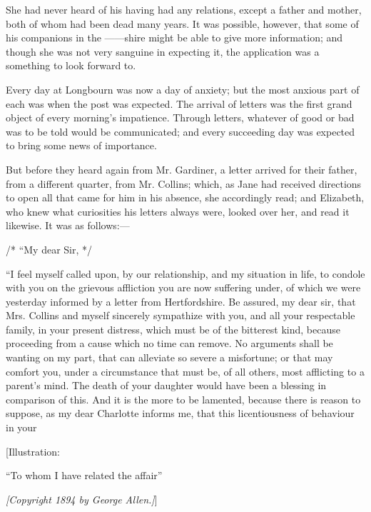\documentclass[12pt]{book}
\begin{document}
She had never heard of his having had any relations, except a father and mother, both of whom had been dead many years. It was possible, however, that some of his companions in the ------shire might be able to give more information; and though she was not very sanguine in expecting it, the application was a something to look forward to.

Every day at Longbourn was now a day of anxiety; but the most anxious part of each was when the post was expected. The arrival of letters was the first grand object of every morning's impatience. Through letters, whatever of good or bad was to be told would be communicated; and every succeeding day was expected to bring some news of importance.

But before they heard again from Mr. Gardiner, a letter arrived for their father, from a different quarter, from Mr. Collins; which, as Jane had received directions to open all that came for him in his absence, she accordingly read; and Elizabeth, who knew what curiosities his letters always were, looked over her, and read it likewise. It was as follows:---

/* ``My dear Sir, */

``I feel myself called upon, by our relationship, and my situation in life, to condole with you on the grievous affliction you are now suffering under, of which we were yesterday informed by a letter from Hertfordshire. Be assured, my dear sir, that Mrs. Collins and myself sincerely sympathize with you, and all your respectable family, in your present distress, which must be of the bitterest kind, because proceeding from a cause which no time can remove. No arguments shall be wanting on my part, that can alleviate so severe a misfortune; or that may comfort you, under a circumstance that must be, of all others, most afflicting to a parent's mind. The death of your daughter would have been a blessing in comparison of this. And it is the more to be lamented, because there is reason to suppose, as my dear Charlotte informs me, that this licentiousness of behaviour in your

[Illustration:

``To whom I have related the affair''

\emph{[\textit{Copyright 1894 by George Allen.}]}]
\end{document}
